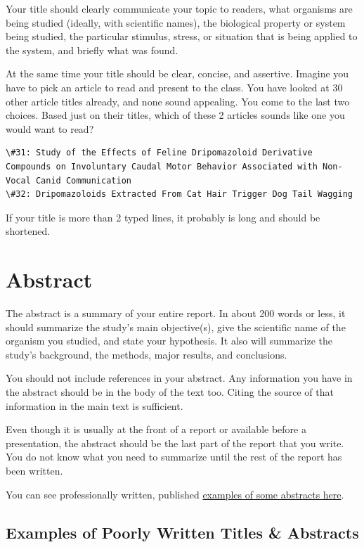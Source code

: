 \documentclass[
]{book}
\begin{document}
Your title should clearly communicate your topic to readers, what organisms are being studied (ideally, with scientific names), the biological property or system being studied, the particular stimulus, stress, or situation that is being applied to the system, and briefly what was found.

At the same time your title should be clear, concise, and assertive. Imagine you have to pick an article to read and present to the class. You have looked at 30 other article titles already, and none sound appealing. You come to the last two choices. Based just on their titles, which of these 2 articles sounds like one you would want to read?

\begin{verbatim}
\#31: Study of the Effects of Feline Dripomazoloid Derivative Compounds on Involuntary Caudal Motor Behavior Associated with Non-Vocal Canid Communication
\#32: Dripomazoloids Extracted From Cat Hair Trigger Dog Tail Wagging
\end{verbatim}

If your title is more than 2 typed lines, it probably is long and should be shortened.

\hypertarget{abstract}{%
\section{Abstract}\label{abstract}}

The abstract is a summary of your entire report. In about 200 words or less, it should summarize the study's main objective(s), give the scientific name of the organism you studied, and state your hypothesis. It also will summarize the study's background, the methods, major results, and conclusions.

You should not include references in your abstract. Any information you have in the abstract should be in the body of the text too. Citing the source of that information in the main text is sufficient.

Even though it is usually at the front of a report or available before a presentation, the abstract should be the last part of the report that you write. You do not know what you need to summarize until the rest of the report has been written.

You can see professionally written, published \protect\hyperlink{paraphrasingone506}{examples of some abstracts here}.

\hypertarget{examples-of-poorly-written-titles-abstracts}{%
\subsection{Examples of Poorly Written Titles \& Abstracts}\label{examples-of-poorly-written-titles-abstracts}}
\end{document}
